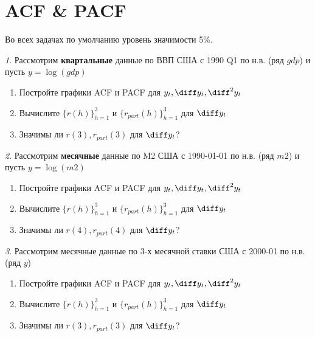 \documentclass[12pt]{article}
\theoremstyle{remark}
\newtheorem{exercise}{}[subsection]
\begin{document}
\section{ACF \& PACF}

Во всех задачах по умолчанию уровень значимости 5\%.

\begin{exercise}
Рассмотрим \textbf{квартальные} данные по ВВП США с 1990 Q1 по н.в. (ряд \(gdp\))
и пусть \(y=\log(gdp)\)
\begin{enumerate}
	\item Постройте графики ACF и PACF для \(y_t, \diff y_t, \diff^2 y_t\)
	\item Вычислите  \(\{r(h)\}_{h=1}^3\) и \(\{r_{part}(h)\}_{h=1}^3\) для \(\diff y_t\)
	\item Значимы ли \(r(3),r_{part}(3)\) для \(\diff y_t\)?
\end{enumerate}
\end{exercise}

\begin{exercise}
Рассмотрим \textbf{месячные} данные по M2 США с 1990-01-01 по н.в. (ряд \(m2\))
и пусть \(y=\log(m2)\)
\begin{enumerate}
	\item Постройте графики ACF и PACF для \(y_t, \diff y_t, \diff^2 y_t\)
	\item Вычислите  \(\{r(h)\}_{h=1}^3\) и \(\{r_{part}(h)\}_{h=1}^3\) для \(\diff y_t\)
	\item Значимы ли \(r(4),r_{part}(4)\) для \(\diff y_t\)?
\end{enumerate}
\end{exercise}

\begin{exercise}
Рассмотрим месячные данные по 3-х месячной ставки США с 2000-01 по н.в. (ряд \(y\))
\begin{enumerate}
	\item Постройте графики ACF и PACF для \(y_t, \diff y_t, \diff^2 y_t\)
	\item Вычислите  \(\{r(h)\}_{h=1}^3\) и \(\{r_{part}(h)\}_{h=1}^3\) для \(\diff y_t\)
	\item Значимы ли \(r(3),r_{part}(3)\) для \(\diff y_t\)?
\end{enumerate}
\end{exercise}
\end{document}
